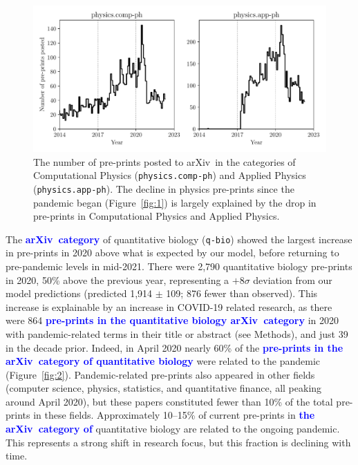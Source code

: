 \documentclass[]{rsos}%
\newcommand{\arxiv}{arXiv}
\newcommand{\change}[1]{\textcolor{blue}{\textbf{#1}}}
\begin{document}
\begin{figure}[!t]
\includegraphics[width=0.95\linewidth]{physics-pre-prints}
\caption{The number of pre-prints posted to \arxiv\ in the categories of Computational Physics (\texttt{physics.comp-ph}) and Applied Physics (\texttt{physics.app-ph}). The decline in physics pre-prints since the pandemic began (Figure~\ref{fig:1}) is largely explained by the drop in pre-prints in Computational Physics and Applied Physics.}
\label{fig:physics}
\end{figure}



The \change{\arxiv\ category} of quantitative biology (\texttt{q-bio}) showed the largest increase in pre-prints in 2020 above what is expected by our model, before returning to pre-pandemic levels in mid-2021. %
There were {2,790} quantitative biology pre-prints in 2020, {50\%} above the previous year, representing a $+8\sigma$ deviation from our model predictions (predicted 1,914 $\pm$ 109; 876 fewer than observed). This increase is explainable by an increase in COVID-19 related research, as there were 864 \change{pre-prints in the quantitative biology \arxiv\ category} in 2020 with pandemic-related terms in their title or abstract (see Methods), and just 39 in the decade prior. Indeed, in {April 2020} nearly 60\% of the \change{pre-prints in the \arxiv\ category of quantitative biology} were related to the pandemic (Figure~\ref{fig:2}). Pandemic-related pre-prints also appeared in other fields (computer science, physics, statistics, and quantitative finance, all peaking around {April 2020}), but these papers constituted fewer than 10\% of the total pre-prints in these fields. Approximately 10--15\% of current pre-prints in \change{the \arxiv\ category of} quantitative biology are related to the ongoing pandemic. This represents a strong shift in research focus, but this fraction is declining with time. %
\end{document}
